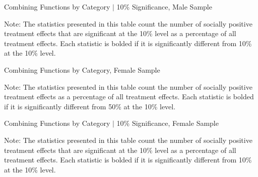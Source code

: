 	\begin{sidewaystable}[H]
	\begin{threeparttable}
     \caption{Combining Functions by Category $|$ 10\% Significance, Male Sample}
     \label{table:abccare_rslt_male_counts_n10a10_all}
	
	\begin{tablenotes}
	\footnotesize
	\item Note: The statistics presented in this table count the number of socially positive treatment
	effects that are significant at the 10\% level as a percentage of all treatment effects. Each statistic
	is bolded if it is significantly different from 10\% at the 10\% level.
	\end{tablenotes}
	\end{threeparttable}
	\end{sidewaystable}

	\begin{sidewaystable}[H]
	\begin{threeparttable}
     \caption{Combining Functions by Category, Female Sample}
     \label{table:abccare_rslt_female_counts_n50a100_all}
	
	\begin{tablenotes}
	\footnotesize
	\item Note: The statistics presented in this table count the number of socially positive treatment
	 effects as a percentage of all treatment effects. Each statistic is bolded if it is significantly
	 different from 50\% at the 10\% level.
	\end{tablenotes}
	\end{threeparttable}
	\end{sidewaystable}

	\begin{sidewaystable}[H]
	\begin{threeparttable}
     \caption{Combining Functions by Category $|$ 10\% Significance, Female Sample}
     \label{table:abccare_rslt_female_counts_n10a10_all}
	
	\begin{tablenotes}
	\footnotesize
	\item Note: The statistics presented in this table count the number of socially positive treatment
	effects that are significant at the 10\% level as a percentage of all treatment effects. Each statistic
	is bolded if it is significantly different from 10\% at the 10\% level.
	\end{tablenotes}
	\end{threeparttable}
	\end{sidewaystable}   